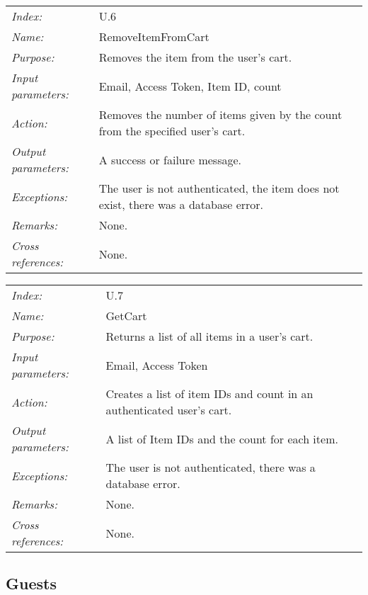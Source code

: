\documentclass[10pt,letter]{article}
\begin{document}
\begin{tabularx}{\textwidth}{l X}
    \it{Index:} & U.6 \\
    \it{Name:} & RemoveItemFromCart \\
    \it{Purpose:} & Removes the item from the user's cart. \\
    \it{Input parameters:} & Email, Access Token, Item ID, count \\
    \it{Action:} & Removes the number of items given by the count from the specified user's cart. \\
    \it{Output parameters:} & A success or failure message. \\
    \it{Exceptions:} & The user is not authenticated, the item does not exist, there was a database error. \\
    \it{Remarks:} & None. \\
    \it{Cross references:} & None. \\
    \hline
\end{tabularx}

\begin{tabularx}{\textwidth}{l X}
    \it{Index:} & U.7 \\
    \it{Name:} & GetCart \\
    \it{Purpose:} & Returns a list of all items in a user's cart. \\
    \it{Input parameters:} & Email, Access Token \\
    \it{Action:} & Creates a list of item IDs and count in an authenticated user's cart. \\
    \it{Output parameters:} & A list of Item IDs and the count for each item. \\
    \it{Exceptions:} & The user is not authenticated, there was a database error. \\
    \it{Remarks:} & None. \\
    \it{Cross references:} & None. \\
    \hline
\end{tabularx}

\subsection{Guests}
\end{document}
